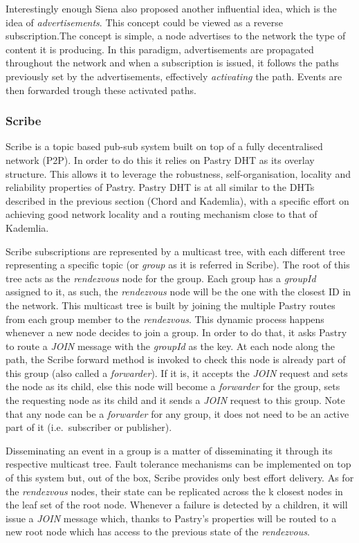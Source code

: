 Interestingly enough Siena also proposed another influential idea, which
is the idea of \emph{advertisements}. This concept could be viewed as a
reverse subscription.The concept is simple, a node advertises to the
network the type of content it is producing. In this paradigm,
advertisements are propagated throughout the network and when a
subscription is issued, it follows the paths previously set by the
advertisements, effectively \emph{activating} the path. Events are then
forwarded trough these activated paths.

\subsubsection{Scribe}\label{scribe}

Scribe \cite{Castro2002} is a topic based pub-sub system built
on top of a fully decentralised network (P2P). In order to do this it
relies on Pastry DHT as its overlay structure. This allows it to
leverage the robustness, self-organisation, locality and reliability
properties of Pastry. Pastry DHT is at all similar to the DHTs described
in the previous section (Chord and Kademlia), with a specific effort on
achieving good network locality and a routing mechanism close to that of
Kademlia.

Scribe subscriptions are represented by a multicast tree, with each
different tree representing a specific topic (or \emph{group} as it is
referred in Scribe). The root of this tree acts as the \emph{rendezvous}
node for the group. Each group has a \emph{groupId} assigned to it, as
such, the \emph{rendezvous} node will be the one with the closest ID in
the network. This multicast tree is built by joining the multiple Pastry
routes from each group member to the \emph{rendezvous}. This dynamic
process happens whenever a new node decides to join a group. In order to
do that, it asks Pastry to route a \emph{JOIN} message with the
\emph{groupId} as the key. At each node along the path, the Scribe
forward method is invoked to check this node is already part of this
group (also called a \emph{forwarder}). If it is, it accepts the
\emph{JOIN} request and sets the node as its child, else this node will
become a \emph{forwarder} for the group, sets the requesting node as its
child and it sends a \emph{JOIN} request to this group. Note that any
node can be a \emph{forwarder} for any group, it does not need to be an active
part of it (i.e.~subscriber or publisher).

Disseminating an event in a group is a matter of disseminating it
through its respective multicast tree. Fault tolerance mechanisms can be
implemented on top of this system but, out of the box, Scribe provides
only best effort delivery. As for the \emph{rendezvous} nodes, their
state can be replicated across the k closest nodes in the leaf set of
the root node. Whenever a failure is detected by a children, it will
issue a \emph{JOIN} message which, thanks to Pastry's properties will be
routed to a new root node which has access to the previous state of the
\emph{rendezvous}.

